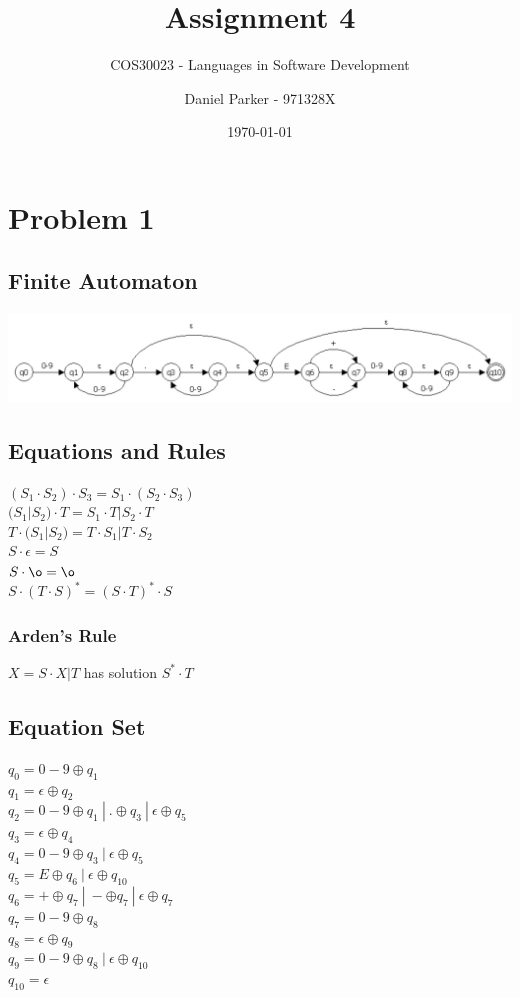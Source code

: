 \documentclass[11pt, numbers=endperiod, parskip=half]{scrartcl}
\title{Assignment 4}
\subtitle{COS30023 - Languages in Software Development}
\author{Daniel Parker - 971328X}
\date{\today}
\begin{document}

\maketitle

\section{Problem 1}
\subsection{Finite Automaton}
\includegraphics[scale=0.4]{automaton.png}

\subsection{Equations and Rules}
\((S_1 \cdot S_2 ) \cdot S_3 = S_1 \cdot (S_2 \cdot S_3)\)\\
\( (S_1 | S_2) \cdot T = S_1 \cdot T | S_2 \cdot T \)\\
\( T \cdot (S_1 | S_2) = T \cdot S_1 | T \cdot S_2 \)\\
\( S \cdot \epsilon = S \)\\
\( S \cdot \o = \o\)\\
\( S \cdot ( T \cdot S )^* = (S \cdot T)^* \cdot S \)

\subsubsection{Arden's Rule}
\(X = S \cdot X | T\) has solution \(S^* \cdot T\)

\subsection{Equation Set}
\(q_0 = 0-9 \oplus q_1\)\\
\(q_1 = \epsilon \oplus q_2\)\\
\(q_2 = 0-9 \oplus q_1\ |\ . \oplus q_3\ |\ \epsilon \oplus q_5 \)\\
\(q_3 = \epsilon \oplus q_4\)\\
\(q_4 = 0-9 \oplus q_3\ |\ \epsilon \oplus q_5\)\\
\(q_5 = E \oplus q_6\ |\ \epsilon \oplus q_{10}\)\\
\(q_6 = + \oplus q_7\ |\ - \oplus q_7\ |\ \epsilon \oplus q_7\)\\
\(q_7 = 0-9 \oplus q_8\)\\
\(q_8 = \epsilon \oplus q_9\)\\
\(q_9 = 0-9 \oplus q_8\ |\ \epsilon \oplus q_{10}\)\\
\(q_{10} = \epsilon\)
\end{document}
